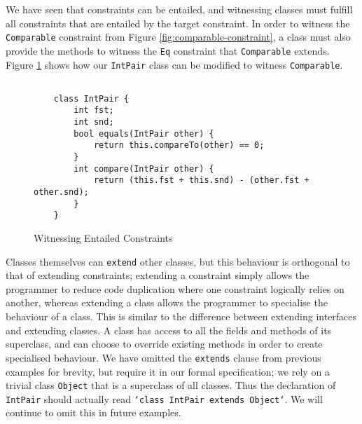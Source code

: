 We have seen that constraints can be entailed, and witnessing classes must fulfill all constraints that are entailed by the target constraint. In order to witness the \texttt{Comparable} constraint from Figure \ref{fig:comparable-constraint}, a class must also provide the methods to witness the \texttt{Eq} constraint that \texttt{Comparable} extends. Figure \ref{fig:comparable-class} shows how our \texttt{IntPair} class can be modified to witness \texttt{Comparable}. \\

\begin{figure}[h]
    \centering
    \begin{verbatim}
    
    class IntPair {
        int fst;
        int snd;
        bool equals(IntPair other) {
            return this.compareTo(other) == 0;
        } 
        int compare(IntPair other) {
            return (this.fst + this.snd) - (other.fst + other.snd);
        }
    }
    \end{verbatim}
    \caption{Witnessing Entailed Constraints}
    \label{fig:comparable-class}
\end{figure}

Classes themselves can \texttt{extend} other classes, but this behaviour is orthogonal to that of extending constraints; extending a constraint simply allows the programmer to reduce code duplication where one constraint logically relies on another, whereas extending a class allows the programmer to specialise the behaviour of a class. This is similar to the difference between extending interfaces and extending classes. A class has access to all the fields and methods of its superclass, and can choose to override existing methods in order to create specialised behaviour. We have omitted the \texttt{extends} clause from previous examples for brevity, but require it in our formal specification; we rely on a trivial class \texttt{Object} that is a superclass of all classes. Thus the declaration of \texttt{IntPair} should actually read \texttt{`class IntPair extends Object`}. We will continue to omit this in future examples. \\

